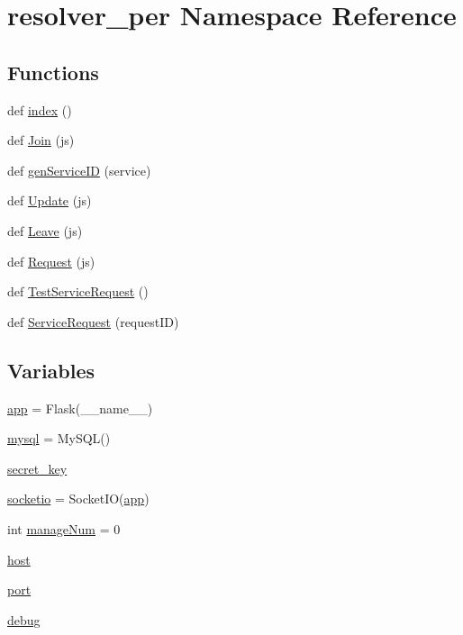 \hypertarget{namespaceresolver__per}{}\section{resolver\+\_\+per Namespace Reference}
\label{namespaceresolver__per}
\subsection*{Functions}
\begin{DoxyCompactItemize}
\item 
def \hyperlink{namespaceresolver__per_adf7687b96bf366860aaddd6e085c798d}{index} ()
\item 
def \hyperlink{namespaceresolver__per_aafc33fa1663febb11a28e1fef278584e}{Join} (js)
\item 
def \hyperlink{namespaceresolver__per_ad7acec5b23e59f2be4c2c3bbd9160de0}{gen\+Service\+ID} (service)
\item 
def \hyperlink{namespaceresolver__per_a067b32d5eafe3f4d33bffd0615f8c3ae}{Update} (js)
\item 
def \hyperlink{namespaceresolver__per_a4d7dc2f5f8d84108435ffa64513814ff}{Leave} (js)
\item 
def \hyperlink{namespaceresolver__per_a29c3ee72f27193ecacec7671427e8367}{Request} (js)
\item 
def \hyperlink{namespaceresolver__per_a7fd69725f008b767637feb6d99a4728b}{Test\+Service\+Request} ()
\item 
def \hyperlink{namespaceresolver__per_a1f8dbdabd97d965265d2672c0f620115}{Service\+Request} (request\+ID)
\end{DoxyCompactItemize}
\subsection*{Variables}
\begin{DoxyCompactItemize}
\item 
\hyperlink{namespaceresolver__per_a935a52010c287b6f5a4133476cca735d}{app} = Flask(\+\_\+\+\_\+name\+\_\+\+\_\+)
\item 
\hyperlink{namespaceresolver__per_a02391c09145731e1b228981b89257ebc}{mysql} = My\+S\+QL()
\item 
\hyperlink{namespaceresolver__per_a11c977c9f7bf603f65e9e2258f724c14}{secret\+\_\+key}
\item 
\hyperlink{namespaceresolver__per_ab483cc1c4f674be3c07d93c64feb3b6d}{socketio} = Socket\+IO(\hyperlink{namespaceresolver__per_a935a52010c287b6f5a4133476cca735d}{app})
\item 
int \hyperlink{namespaceresolver__per_ab2a86a37929b5b79739f5287af715959}{manage\+Num} = 0
\item 
\hyperlink{namespaceresolver__per_a3ed78c58e0622d2f75a22407ecf907bd}{host}
\item 
\hyperlink{namespaceresolver__per_ae5892abe15432d9fd990a19ce26de1f3}{port}
\item 
\hyperlink{namespaceresolver__per_a6279d1ec0660c5d906a9f87a3e81c7f4}{debug}
\end{DoxyCompactItemize}


